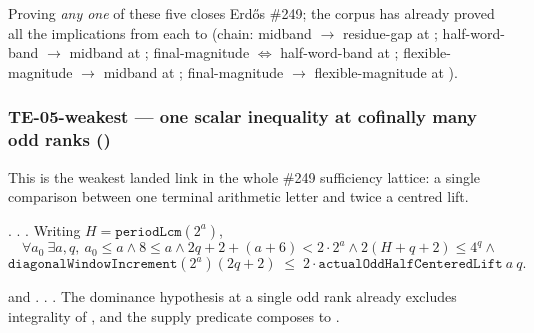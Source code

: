 \begin{prop}
Proving \emph{any one} of these five closes Erd\H{o}s \#249; the corpus has already proved all the
implications from each to
 (chain:
midband $\to$ residue-gap at ; half-word-band
$\to$ midband at ; final-magnitude
$\Leftrightarrow$ half-word-band at ;
flexible-magnitude $\to$ midband at ;
final-magnitude $\to$ flexible-magnitude at ).
\end{prop}

\subsubsection{TE-05-weakest --- one scalar inequality at cofinally many odd ranks ()}

This is the weakest landed link in the whole \#249 sufficiency lattice: a single comparison
between one terminal arithmetic letter and twice a centred lift.

\begin{defn}
.
. . Writing $H=\mathtt{periodLcm}(2^a)$,
\[
  \forall a_0\ \exists a,q,\ a_0\le a \wedge 8\le a \wedge 2q{+}2{+}(a{+}6)<2\cdot 2^a \wedge
  2(H{+}q{+}2)\le 4^q \wedge
\]
\[
  \mathtt{diagonalWindowIncrement}(2^a)(2q{+}2) \;\le\; 2\cdot \mathtt{actualOddHalfCenteredLift}\ a\ q .
\]
\end{defn}

\begin{thm}[Consumer]
and
.
. . The dominance hypothesis at a single odd rank already excludes
integrality of , and the supply predicate composes to
.
\end{thm}

